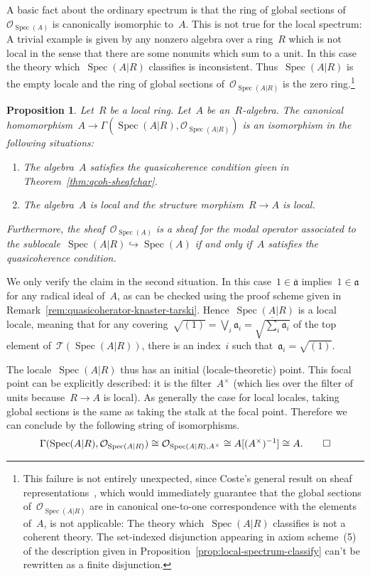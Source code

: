 \documentclass[10pt,reqno,a4paper]{amsbook}
\makeatletter
\theoremstyle{definition}
\theoremstyle{plain}
\newtheorem{prop}[defn]{Proposition}
\theoremstyle{remark}
\renewcommand{\O}{\mathcal{O}}
\newcommand{\T}{\mathcal{T}}
\newcommand{\aaa}{\mathfrak{a}}
\DeclareMathOperator{\Spec}{Spec}
\newcommand{\Open}{\T}
\newcommand{\?}{\,{:}\,}
\renewcommand{\_}{\mathpunct{.}\,}
\renewenvironment{proof}[1][\proofname]{\par
  \pushQED{\qed}%
  \normalfont \topsep6\p@\@plus6\p@\relax
  \trivlist
  \item[\hskip\labelsep
        \itshape
    #1\@addpunct{.}]\ignorespaces
}{%
  \popQED\endtrivlist\@endpefalse
}
\makeatother
\begin{document}
A basic fact about the ordinary spectrum is that the ring of global sections
of~$\O_{\Spec(A)}$ is canonically isomorphic to~$A$. This is not true for the
local spectrum: A trivial example is given by any nonzero algebra over a
ring~$R$ which is not local in the sense that there are some nonunits which sum
to a unit. In this case the theory which~$\Spec(A|R)$ classifies is
inconsistent. Thus~$\Spec(A|R)$ is the empty locale and the ring of global
sections of~$\O_{\Spec(A|R)}$ is the zero ring.\footnote{This failure is not
entirely unexpected, since Coste's general result on sheaf
representations~\cite[Theorem~5.1.1]{coste:sheaf-representation}, which would
immediately guarantee that the global sections of~$\O_{\Spec(A|R)}$ are in
canonical one-to-one correspondence with the elements of~$A$, is not
applicable: The theory which~$\Spec(A|R)$ classifies is not a coherent
theory. The set-indexed disjunction appearing in axiom scheme~(5) of the
description given in Proposition~\ref{prop:local-spectrum-classify} can't be
rewritten as a finite disjunction.}

\begin{prop}\label{prop:local-spectrum-global-functions}
Let~$R$ be a local ring. Let~$A$ be an~$R$-algebra. The canonical
homomorphism~$A \to \Gamma(\Spec(A|R), \O_{\Spec(A|R)})$ is an isomorphism in
the following situations:
\begin{enumerate}
\item The algebra~$A$ satisfies the quasicoherence condition given in
Theorem~\ref{thm:qcoh-sheafchar}.
\item The algebra~$A$ is local and the structure morphism~$R \to A$ is local.
\end{enumerate}
Furthermore, the sheaf~$\O_{\Spec(A)}$ is a sheaf
for the modal operator associated to the sublocale~$\Spec(A|R) \hookrightarrow
\Spec(A)$ if and only if~$A$ satisfies the quasicoherence condition.
\end{prop}

\begin{proof}We only verify the claim in the second situation. In this
case~$1 \in \overline{\aaa}$ implies~$1 \in \aaa$ for any radical ideal of~$A$,
as can be checked using the proof scheme given in
Remark~\ref{rem:quasicoherator-knaster-tarski}.
Hence~$\Spec(A|R)$ is a local locale, meaning that for any covering~$\sqrt{(1)}
= \bigvee_i \aaa_i = \overline{\sqrt{\sum_i \aaa_i}}$ of the top element
of~$\Open(\Spec(A|R))$, there is an index~$i$ such that~$\aaa_i = \sqrt{(1)}$.

The locale~$\Spec(A|R)$ thus has an initial (locale-theoretic) point. This
focal point can be explicitly described: it is the filter~$A^\times$ (which
lies over the filter of units because~$R \to A$ is local). As generally the
case for local locales, taking global sections is the same as taking the stalk
at the focal point. Therefore we can conclude by the following string of
isomorphisms.
\[ \Gamma(\Spec(A|R), \O_{\Spec(A|R)}) \cong
  \O_{\Spec(A|R), A^\times} \cong
  A[(A^\times)^{-1}] \cong
  A. \qedhere \]
\end{proof}
\end{document}
